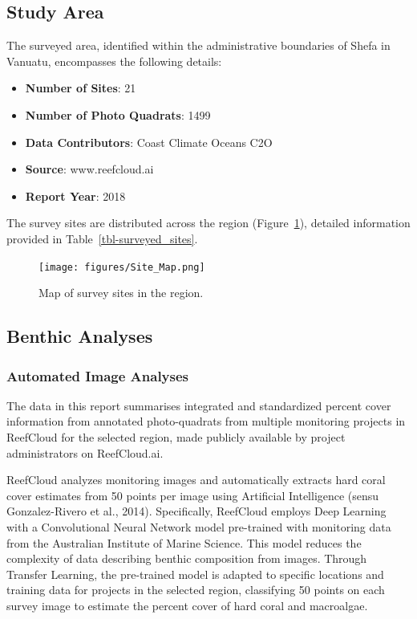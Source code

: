 \documentclass[
  letterpaper,
  DIV=11,
  numbers=noendperiod]{scrartcl}
\providecommand{\tightlist}{%
  \setlength{\itemsep}{0pt}\setlength{\parskip}{0pt}}\usepackage{longtable,booktabs,array}
\begin{document}
\subsection{Study Area}\label{study-area}

The surveyed area, identified within the administrative boundaries of
Shefa in Vanuatu, encompasses the following details:

\begin{itemize}
\tightlist
\item
  \textbf{Number of Sites}: 21
\item
  \textbf{Number of Photo Quadrats}: 1499
\item
  \textbf{Data Contributors}: Coast Climate Oceans C2O
\item
  \textbf{Source}: www.reefcloud.ai
\item
  \textbf{Report Year}: 2018
\end{itemize}

The survey sites are distributed across the region
(Figure~\ref{fig-map}), detailed information provided in
Table~\ref{tbl-surveyed_sites}.

\begin{figure}[H]

\texttt{[image: figures/Site\_Map.png]}

\caption{\label{fig-map}Map of survey sites in the region.}

\end{figure}%

\subsection{Benthic Analyses}\label{benthic-analyses}

\subsubsection{Automated Image Analyses}\label{automated-image-analyses}

The data in this report summarises integrated and standardized percent
cover information from annotated photo-quadrats from multiple monitoring
projects in ReefCloud for the selected region, made publicly available
by project administrators on ReefCloud.ai.

ReefCloud analyzes monitoring images and automatically extracts hard
coral cover estimates from 50 points per image using Artificial
Intelligence (sensu Gonzalez-Rivero et al., 2014). Specifically,
ReefCloud employs Deep Learning with a Convolutional Neural Network
model pre-trained with monitoring data from the Australian Institute of
Marine Science. This model reduces the complexity of data describing
benthic composition from images. Through Transfer Learning, the
pre-trained model is adapted to specific locations and training data for
projects in the selected region, classifying 50 points on each survey
image to estimate the percent cover of hard coral and macroalgae.
\end{document}
